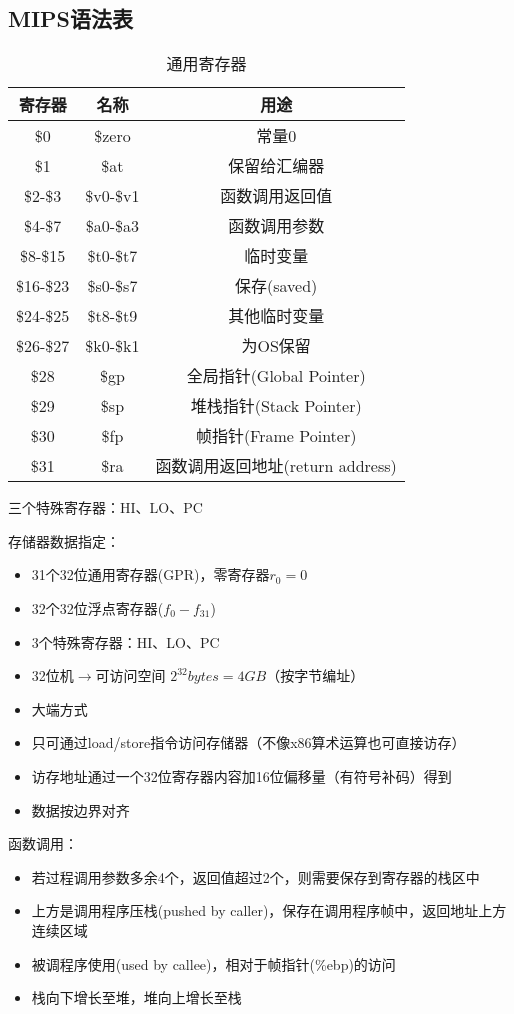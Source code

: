 \subsection{MIPS语法表}
\begin{table}
\centering
\caption{通用寄存器}
\begin{tabular}{|c|c|c|}
\hline
寄存器 & 名称 & 用途\\\hline
\$0 & \$zero & 常量0\\\hline
\$1 & \$at & 保留给汇编器\\\hline
\$2-\$3 & \$v0-\$v1 & 函数调用返回值\\\hline
\$4-\$7 & \$a0-\$a3 & 函数调用参数\\\hline
\$8-\$15 & \$t0-\$t7 & 临时变量\\\hline
\$16-\$23 & \$s0-\$s7 & 保存(saved)\\\hline
\$24-\$25 & \$t8-\$t9 & 其他临时变量\\\hline
\$26-\$27 & \$k0-\$k1 & 为OS保留\\\hline
\$28 & \$gp & 全局指针(Global Pointer)\\\hline
\$29 & \$sp & 堆栈指针(Stack Pointer)\\\hline
\$30 & \$fp & 帧指针(Frame Pointer)\\\hline
\$31 & \$ra & 函数调用返回地址(return address)\\\hline
\end{tabular}
\end{table}
三个特殊寄存器：HI、LO、PC\par
存储器数据指定：
\begin{itemize}
	\item 31个32位通用寄存器(GPR)，零寄存器$r_0=0$
	\item 32个32位浮点寄存器($f_0-f_{31}$)
	\item 3个特殊寄存器：HI、LO、PC
	\item 32位机$\to$可访问空间 $2^{32}bytes=4GB$（按字节编址）
	\item 大端方式
	\item 只可通过load/store指令访问存储器（不像x86算术运算也可直接访存）
	\item 访存地址通过一个32位寄存器内容加16位偏移量（有符号补码）得到
	\item 数据按边界对齐
\end{itemize}
函数调用：
\begin{itemize}
	\item 若过程调用参数多余4个，返回值超过2个，则需要保存到寄存器的栈区中
	\item 上方是调用程序压栈(pushed by caller)，保存在调用程序帧中，返回地址上方连续区域
	\item 被调程序使用(used by callee)，相对于帧指针(\%ebp)的访问
	\item 栈向下增长至堆，堆向上增长至栈
\end{itemize}

